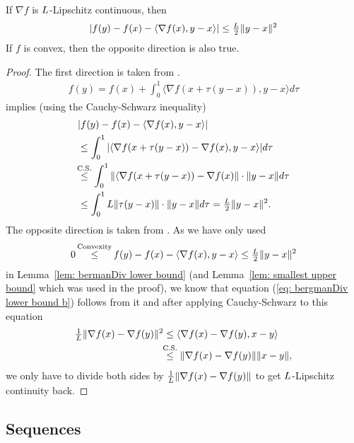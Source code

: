 \begin{lemma}
	\label{Appdx-lem: Lipschitz Gradient implies taylor inequality}
	If \(\nabla f\) is \(L\)-Lipschitz continuous, then
	\begin{align*}
		|f(y) - f(x) - \langle \nabla f(x), y-x\rangle | \le \tfrac{L}2 \|y-x\|^2
	\end{align*}
	If \(f\) is convex, then the opposite direction is also true.
\end{lemma}
\begin{proof}
	The first direction is taken from \textcite[Lemma
	1.2.3]{nesterovLecturesConvexOptimization2018}.
 \begin{align*}
		f(y) = f(x) + \int_0^1\langle\nabla f(x+\tau(y-x)), y-x \rangle d\tau
	\end{align*}
	implies (using the  Cauchy-Schwarz inequality)
	\begin{align*}
		&| f(y) - f(x) - \langle \nabla f(x), y-x\rangle | \\
		&\le \int_0^1 | \langle\nabla f(x+\tau(y-x))-\nabla f(x), y-x\rangle | d\tau \\
		&\lxle{\text{C.S.}}
		\int_0^1 \|\langle\nabla f(x+\tau(y-x))-\nabla f(x)\| \cdot \|y-x\| d\tau\\
		&\le \int_0^1 \ubound \|\tau(y-x)\|\cdot\|y-x\| d\tau
		= \tfrac{\ubound}2 \|y-x\|^2.
	\end{align*}
	The opposite direction is taken from \textcite[Lemma
	2.1.5]{nesterovLecturesConvexOptimization2018}.
	As we have only used
	\begin{align*}
		0\xle{\text{Convexity}} f(y) - f(x) - \langle \nabla f(x), y-x\rangle
		\le \tfrac{\ubound}2 \|y-x\|^2
	\end{align*}	
	in Lemma~\ref{lem: bermanDiv lower bound} (and Lemma~\ref{lem: smallest upper
	bound} which was used in the proof), we know that equation (\ref{eq:
	bergmanDiv lower bound b}) follows from it and after applying Cauchy-Schwarz
	to this equation
	\begin{align*}
		\tfrac{1}\ubound \|\nabla f(x)-\nabla f(y)\|^2
		&\le \langle \nabla f(x) - \nabla f(y), x-y\rangle \\
		&\lxle{\text{C.S.}} \|\nabla f(x) - \nabla f(y)\| \|x-y\|,
	\end{align*}
	we only have to divide both sides by \(\tfrac{1}{L} \|\nabla f(x)-\nabla
	f(y)\|\) to get \(L\)-Lipschitz continuity back.
\end{proof}

\subsection{Sequences}

